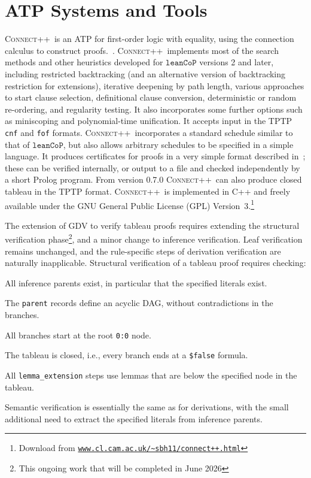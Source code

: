 \documentclass{ceurart}
\newcommand{\smalltt}[1]{\small \texttt{#1}}
\newenvironment{packed_itemize}{
\vspace*{-0.3em}
\begin{itemize}
\setlength{\partopsep}{0pt}
\setlength{\itemsep}{1pt}
\setlength{\parskip}{0pt}
\setlength{\parsep}{0pt}
}{\end{itemize}}
\begin{document}
\section{ATP Systems and Tools}
\label{SystemsTools}

\newcommand{\cpp}{\textsc{Connect++}}

\cpp\ is an ATP for first-order logic with equality, using the connection calculus to construct 
proofs.~\cite{Hol23}.
\cpp\ implements most of the search methods and other heuristics developed for $\mathtt{leanCoP}$ 
versions 2 and later, including restricted backtracking (and an alternative version of backtracking 
restriction for extensions), iterative deepening by path length, various approaches to start clause 
selection, definitional clause conversion, deterministic or random re-ordering, and regularity 
testing. 
It also incorporates some further options such as miniscoping and polynomial-time unification.
It accepts input in the TPTP \smalltt{cnf} and \smalltt{fof} formats. 
\cpp\ incorporates a standard schedule similar to that of $\mathtt{leanCoP}$, but also allows 
arbitrary schedules to be specified in a simple language. 
It produces certificates for proofs in a very simple format described in~\cite{Hol23,OH23};
these can be verified internally, or output to a file and checked independently by a short Prolog 
program. 
From version 0.7.0 \cpp\ can also produce closed tableau in the TPTP format.
\cpp\ is implemented in C++ and freely available under the GNU General Public License (GPL) 
Version~3.\footnote{%
Download from \href{https://www.cl.cam.ac.uk/~sbh11/connect++.html}{\tt www.cl.cam.ac.uk/\textasciitilde sbh11/connect++.html}}

The extension of GDV to verify tableau proofs requires extending the structural verification 
phase\footnote{%
This ongoing work that will be completed in June 2026}, and a minor change to inference 
verification.
Leaf verification remains unchanged, and the rule-specific steps of derivation verification
are naturally inapplicable.
Structural verification of a tableau proof requires checking:
\begin{packed_itemize}
\item All inference parents exist, in particular that the specified literals exist.
\item The \smalltt{parent} records define an acyclic DAG, without contradictions in the branches.
\item All branches start at the root \smalltt{0:0} node.
\item The tableau is closed, i.e., every branch ends at a \smalltt{\$false} formula.
\item All {\tt lemma\_extension} steps use lemmas that are below the specified node in the tableau.
\end{packed_itemize}
Semantic verification is essentially the same as for derivations, with the small additional need 
to extract the specified literals from inference parents.
\end{document}
